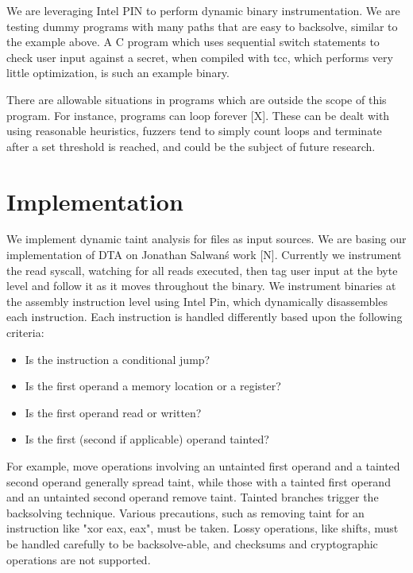 \documentclass[11pt,expanded,copyright]{fsuthesis}
\begin{document}
We are leveraging Intel PIN to perform dynamic binary instrumentation. We are testing dummy programs with many paths that are easy to backsolve, similar to the example above. A C program which uses sequential switch statements to check user input against a secret, when compiled with tcc, which performs very little optimization, is such an example binary. 

There are allowable situations in programs which are outside the scope of this program. For instance, programs can loop forever [X]. These can be dealt with using reasonable heuristics, fuzzers tend to simply count loops and terminate after a set threshold is reached, and could be the subject of future research.


\section{Implementation}

We implement dynamic taint analysis for files as input sources. We are basing our implementation of DTA on Jonathan Salwan\'s work [N]. Currently we instrument the read syscall, watching for all reads executed, then tag user input at the byte level and follow it as it moves throughout the binary. We instrument binaries at the assembly instruction level using Intel Pin, which dynamically disassembles each instruction. Each instruction is handled differently based upon the following criteria:

\begin{itemize}
	\item Is the instruction a conditional jump?
	\item Is the first operand a memory location or a register?
	\item Is the first operand read or written?
	\item Is the first (second if applicable) operand tainted?
\end{itemize}
	
For example, move operations involving an untainted first operand and a tainted second operand generally spread taint, while those with a tainted first operand and an untainted second operand remove taint. Tainted branches trigger the backsolving technique. Various precautions, such as removing taint for an instruction like "xor eax, eax", must be taken. Lossy operations, like shifts, must be handled carefully to be backsolve-able, and checksums and cryptographic operations are not supported.
	
\end{document}
